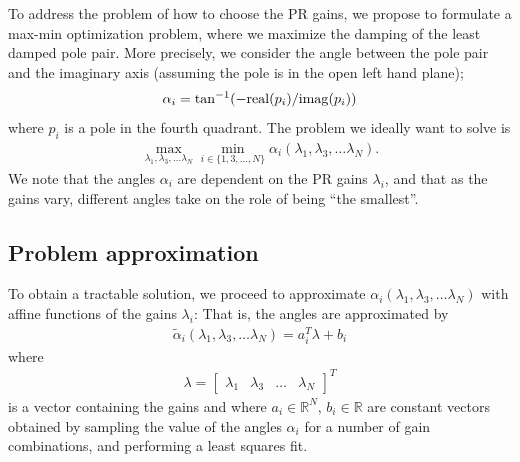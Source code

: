 \documentclass[conference,10pt]{IEEEtran}
\begin{document}
To address the problem of how to choose the PR gains, we propose to formulate a max-min optimization problem, where we maximize the damping of the least damped pole pair. More precisely, we consider the angle between the pole pair and the imaginary axis (assuming the pole is in the open left hand plane);
\begin{align*}
\alpha_i = \tan^{-1}(-{\rm real}(p_i) / {\rm imag}(p_i))
\end{align*}
where $p_i$ is a pole in the fourth quadrant. The problem we ideally want to solve is
\begin{align}
\label{eq:MaxMinProb}
\max_{\lambda_1,\lambda_3,\dots\lambda_N}\min_{i\in \{1,3,\dots,N\}} \alpha_i(\lambda_1,\lambda_3,\dots\lambda_N).
\end{align}
We note that the angles $\alpha_i$ are dependent on the PR gains $\lambda_i$, and that as the gains vary, different angles take on the role of being ``the smallest''.



\subsection{Problem approximation}

To obtain a tractable solution, we proceed to approximate $\alpha_i(\lambda_1,\lambda_3,\dots\lambda_N)$ with affine functions of the gains $\lambda_i$: That is, the angles are approximated by
\begin{align}
\label{eq:AngleApprox}
\tilde{\alpha}_i(\lambda_1,\lambda_3,\dots\lambda_N)
= a_i^T\lambda + b_i
\end{align}
where
\begin{align*}
\lambda =
\begin{bmatrix}
\lambda_1 & \lambda_3 & \dots & \lambda_N
\end{bmatrix}^T
\end{align*}
is a vector containing the gains and where $a_i\in\mathbb{R}^N$, $b_i\in\mathbb{R}$ are constant vectors obtained by sampling the value of the angles
$\alpha_i$ for a number of gain combinations, and performing a least squares fit.
\end{document}
